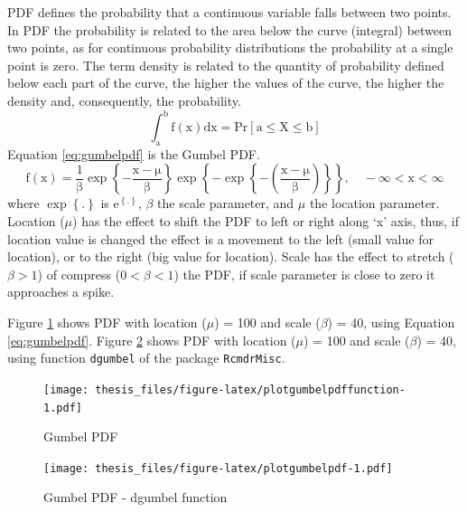\documentclass[12pt,twoside]{reedthesis}
\begin{document}
PDF defines the probability that a continuous variable falls between two points. In PDF the probability is related to the area below the curve (integral) between two points, as for continuous probability distributions the probability at a single point is zero. The term density is related to the quantity of probability defined below each part of the curve, the higher the values of the curve, the higher the density and, consequently, the probability.
\begin{equation}
\mathrm{
        \int_a^b f(x)dx = Pr[a \leq X \leq b]
       }
  \label{eq:pdf}
\end{equation}
Equation \eqref{eq:gumbelpdf} is the Gumbel PDF.
\begin{equation}
  \mathrm{
          f(x)=\frac{1}{\beta}
          \exp\left\{
            -\frac{x-\mu}{\beta}
          \right\}
          \exp\left\{
            -\exp\left\{
              -\left(
                \frac{x-\mu}{\beta}
              \right)
            \right\}
          \right\},
          \quad -\infty < x < \infty
         }
  \label{eq:gumbelpdf}
\end{equation}
where \(\exp\left\{.\right\}\) is \(\mathrm{e}^{\left\{.\right\}}\), \(\beta\) the scale parameter, and \(\mu\) the location parameter. Location (\(\mu\)) has the effect to shift the PDF to left or right along `x' axis, thus, if location value is changed the effect is a movement to the left (small value for location), or to the right (big value for location). Scale has the effect to stretch (\(\beta > 1\)) of compress (\(0 < \beta< 1\)) the PDF, if scale parameter is close to zero it approaches a spike.

Figure \ref{fig:plotgumbelpdffunction} shows PDF with location (\(\mu\)) = 100 and scale (\(\beta\)) = 40, using Equation \eqref{eq:gumbelpdf}. Figure \ref{fig:plotgumbelpdf} shows PDF with location (\(\mu\)) = 100 and scale (\(\beta\)) = 40, using function \texttt{dgumbel} of the package \texttt{RcmdrMisc}.

\footnotesize
\begin{figure}
\centering
\texttt{[image: thesis\_files/figure-latex/plotgumbelpdffunction-1.pdf]}
\caption{\label{fig:plotgumbelpdffunction}Gumbel PDF}
\end{figure}
\normalsize

\footnotesize
\begin{figure}
\centering
\texttt{[image: thesis\_files/figure-latex/plotgumbelpdf-1.pdf]}
\caption{\label{fig:plotgumbelpdf}Gumbel PDF - dgumbel function}
\end{figure}
\normalsize
\end{document}
